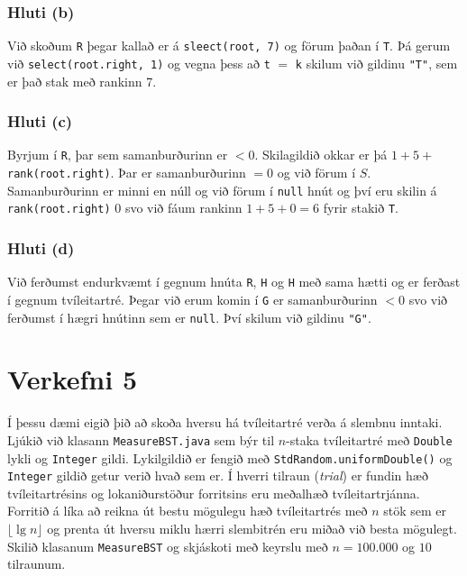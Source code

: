 \documentclass[12pt, a4paper, hidelinks]{article}
\begin{document}
  \subsubsection*{Hluti (b)}
  Við skoðum \texttt{R} þegar kallað er á \texttt{sleect(root, 7)} og förum þaðan í \texttt{T}. Þá gerum við \texttt{select(root.right, 1)}
  og vegna þess að \texttt{t} $=$ \texttt{k} skilum við gildinu \texttt{"T"}, sem er það stak með rankinn 7.

  \subsubsection*{Hluti (c)}
  Byrjum í \texttt{R}, þar sem samanburðurinn er $< 0$. Skilagildið okkar er þá $1 + 5 + $ \texttt{rank(root.right)}. Þar er samanburðurinn $= 0$
  og við förum í $S$. Samanburðurinn er minni en núll og við förum í \texttt{null} hnút og því eru skilin á \texttt{rank(root.right)} $0$ svo við
  fáum rankinn $1 + 5 + 0 = 6$ fyrir stakið \texttt{T}.

  \subsubsection*{Hluti (d)}
  Við ferðumst endurkvæmt í gegnum hnúta \texttt{R}, \texttt{H} og \texttt{H} með sama hætti og er ferðast í gegnum tvíleitartré.
  Þegar við erum komin í \texttt{G} er samanburðurinn $< 0$ svo við ferðumst í hægri hnútinn sem er \texttt{null}. Því skilum við gildinu
  \texttt{"G"}.

  \newpage

  \section*{Verkefni 5}
  Í þessu dæmi eigið þið að skoða hversu há tvíleitartré verða á slembnu inntaki. Ljúkið við klasann \texttt{MeasureBST.java} sem býr til $n$-staka
  tvíleitartré með \texttt{Double} lykli og \texttt{Integer} gildi. Lykilgildið er fengið með \texttt{StdRandom.uniformDouble()} og \texttt{Integer} gildið getur
  verið hvað sem er. Í hverri tilraun (\emph{trial}) er fundin hæð tvíleitartrésins og lokaniðurstöður forritsins eru meðalhæð tvíleitartrjánna. Forritið á líka að reikna út
  bestu mögulegu hæð tvíleitartrés með $n$ stök sem er $\lfloor \lg n\rfloor$ og prenta út hversu miklu hærri slembitrén eru miðað við besta mögulegt. Skilið klasanum \texttt{MeasureBST}
  og skjáskoti með keyrslu með $n = 100.000$ og $10$ tilraunum.
\end{document}
